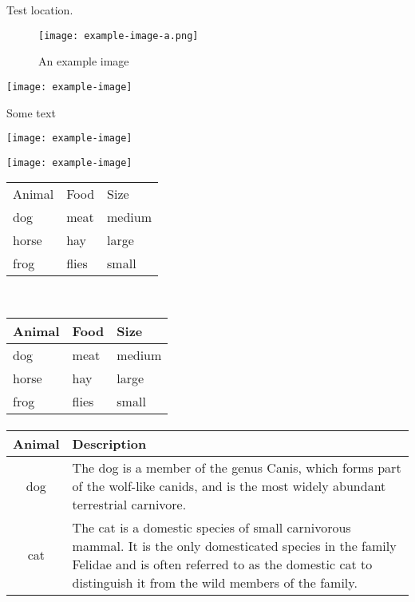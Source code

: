 \documentclass{article}
\begin{document}
\lipsum[1-4] %
Test location.
\begin{figure}[htb]
  \centering
  \texttt{[image: example-image-a.png]}
  \caption{An example image}
\end{figure}

\lipsum[6-10] %


\begin{center}
  \texttt{[image: example-image]}
\end{center}
Some text
\begin{center}
  \texttt{[image: example-image]}
\end{center}
%
\begin{center}
  \texttt{[image: example-image]}
\end{center}
%
\begin{tabular}{*{3}{l}}
  Animal & Food  & Size   \\
  dog    & meat  & medium \\
  horse  & hay   & large  \\
  frog   & flies & small  \\
\end{tabular}
\\
\begin{tabular}{lll}
  \toprule
  Animal & Food  & Size   \\
  \midrule
  dog    & meat  & medium \\
  \cmidrule{1-2}
  horse  & hay   & large  \\
  \cmidrule(r){1-1}
  \cmidrule(rl){2-2}
  \cmidrule(l){3-3}
  frog   & flies & small  \\
  \bottomrule
\end{tabular}
\paragraph{}
\begin{tabular}{cp{9cm}}
  \toprule
  Animal & Description \\
  \midrule
  dog    & The dog is a member of the genus Canis, which forms part of the
           wolf-like canids, and is the most widely abundant terrestrial
           carnivore. \\
  \addlinespace
  cat    & The cat is a domestic species of small carnivorous mammal. It is the
           only domesticated species in the family Felidae and is often referred
           to as the domestic cat to distinguish it from the wild members of the
           family. \\
  \bottomrule
\end{tabular}
\end{document}
